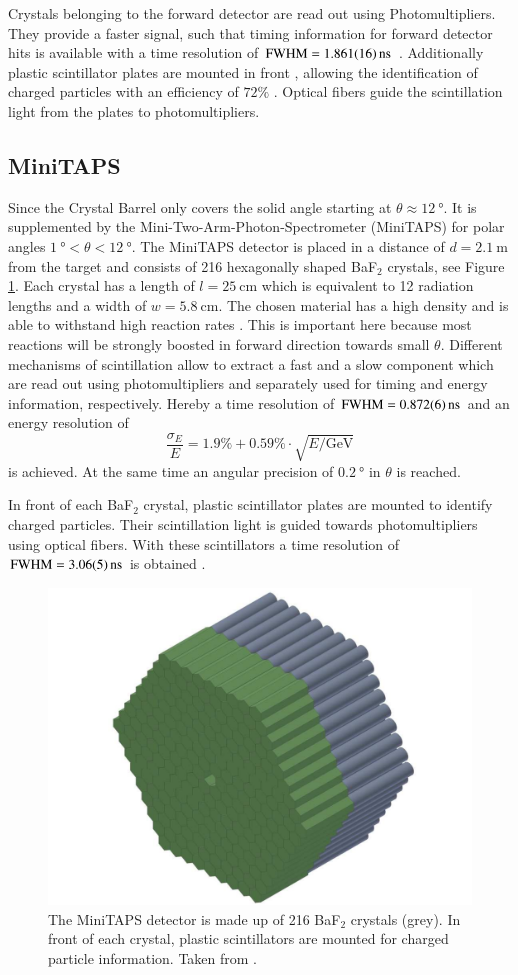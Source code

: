 Crystals belonging to the forward detector are read out using Photomultipliers. They provide a faster signal, such that timing information for forward detector hits is available with a time resolution of $\text{FWHM}=\SI{1.861\pm0.016}{\nano\s}$ \cite{hartmanndipl}. Additionally plastic scintillator plates are mounted in front \cite{wendel}, allowing the identification of charged particles with an efficiency of $72\%$ \cite{fw}. Optical fibers guide the scintillation light from the plates to photomultipliers.
\subsection{MiniTAPS}
\label{sec:mt}
Since the Crystal Barrel only covers the solid angle starting at $\theta\approx\SI{12}{\degree}$. It is supplemented by the Mini-Two-Arm-Photon-Spectrometer (MiniTAPS) \cite{mt1,mt2} for polar angles $\SI{1}{\degree}<\theta<\SI{12}{\degree}$. The MiniTAPS detector is placed in a distance of $d=\SI{2.1}{\m}$ from the target and consists of 216 hexagonally shaped BaF$_2$ crystals, see Figure \ref{fig:minitaps}. Each crystal has a length of $l=\SI{25}{\centi\m}$ which is equivalent to 12 radiation lengths \cite{mtrad} and a width of $w=\SI{5.8}{\centi\meter}$. The chosen material has a high density and is able to withstand high reaction rates \cite{prop}. This is important here because most reactions will be strongly boosted in forward direction towards small $\theta$. Different mechanisms of scintillation allow to extract a fast and a slow component \cite{leo} which are read out using photomultipliers and separately used for timing and energy information, respectively. Hereby a time resolution of $\text{FWHM}=\SI{0.872\pm0.006}{\nano\s}$ \cite{hartmanndipl} and an energy resolution of \cite{mt1} \begin{equation}
	\frac{\sigma_E}{E}=1.9\%+0.59\%\cdot\sqrt{E/\si{\giga\eV}}
	\end{equation}
is achieved. At the same time an angular precision of $\SI{0.2}{\degree}$ in $\theta$ is reached. 

In front of each BaF$_2$ crystal, plastic scintillator plates are mounted to identify charged particles. Their scintillation light is guided towards photomultipliers using optical fibers. With these scintillators a time resolution of $\text{FWHM}=\SI{3.06\pm0.05}{\nano\second}$ is obtained \cite{hartmanndipl}. 
\begin{figure}[htbp]
	\centering
	\includegraphics[width=.5\linewidth]{figs/mini-taps.pdf}
	\caption{The MiniTAPS detector is made up of 216 BaF$_2$ crystals (grey). In front of each crystal, plastic scintillators are mounted for charged particle information. Taken from \cite{cb}.}
	\label{fig:minitaps}
\end{figure}
